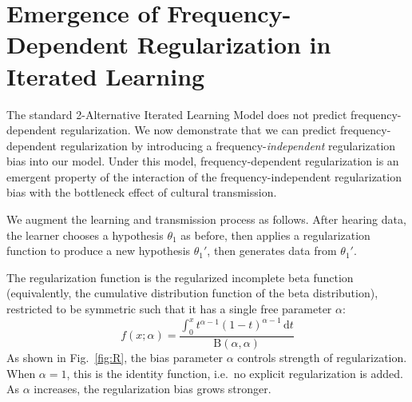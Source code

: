 \documentclass{evolang11}
\begin{document}
\section{Emergence of Frequency-Dependent Regularization in Iterated Learning}
\label{sec:emerg-freq-depend}
%
The standard 2-Alternative Iterated Learning Model does not predict frequency-dependent regularization. We now demonstrate that we can predict frequency-dependent regularization by introducing a frequency-\emph{independent} regularization bias into our model. Under this model, frequency-dependent regularization is an emergent property of the interaction of the frequency-independent regularization bias with the bottleneck effect of cultural transmission.


We augment the learning and transmission process as follows. After hearing data, the learner chooses a hypothesis $\theta_1$ as before, then applies a regularization function to produce a new hypothesis $\theta_1'$, then generates data from $\theta_1'$.

The regularization function is the regularized incomplete beta function (equivalently, the cumulative distribution function of the beta distribution), restricted to be symmetric such that it has a single free parameter $\alpha$:
\begin{equation}
f(x;\alpha) = \frac{\int_0^{x}t^{\alpha-1}(1-t)^{\alpha-1}\,\mathrm{d}t}{\mathrm{B}(\alpha,\alpha)}
\end{equation}
As shown in Fig.\ \ref{fig:R}, the bias parameter $\alpha$ controls strength of regularization. When $\alpha=1$, this is the identity function, i.e.\ no explicit regularization is added. As $\alpha$ increases, the regularization bias grows stronger. 
\end{document}
